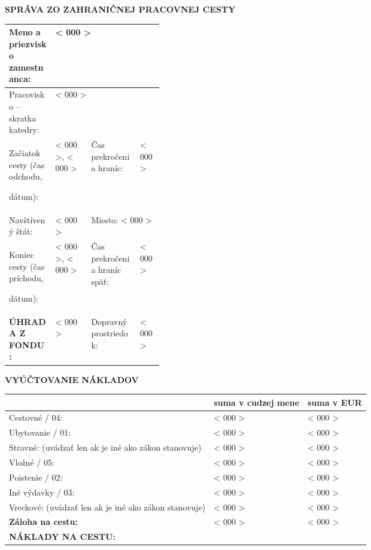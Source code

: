 \documentclass[10pt,a4paper]{article}
\newcommand{\placeholder}[1]{< #1 >}
\newcommand{\name}{\placeholder{000}}
\newcommand{\department}{\placeholder{000}}
\newcommand{\datetimeStart}{\placeholder{000}}
\newcommand{\placeStart}{\placeholder{000}}
\newcommand{\datetimeBorderCrossingStart}{\placeholder{000}}
\newcommand{\country}{\placeholder{000}}
\newcommand{\place}{\placeholder{000}}
\newcommand{\datetimeEnd}{\placeholder{000}}
\newcommand{\placeEnd}{\placeholder{000}}
\newcommand{\datetimeBorderCrossingEnd}{\placeholder{000}}
\newcommand{\sppSymbol}{\placeholder{000}}
\newcommand{\transportation}{\placeholder{000}}
\newcommand{\travellingExpenseForeign}{\placeholder{000}}
\newcommand{\travellingExpense}{\placeholder{000}}
\newcommand{\accommodationExpenseForeign}{\placeholder{000}}
\newcommand{\accommodationExpense}{\placeholder{000}}
\newcommand{\mealsReimbursementForeign}{\placeholder{000}}
\newcommand{\mealsReimbursement}{\placeholder{000}}
\newcommand{\participationExpenseForeign}{\placeholder{000}}
\newcommand{\participationExpense}{\placeholder{000}}
\newcommand{\insuranceExpenseForeign}{\placeholder{000}}
\newcommand{\insuranceExpense}{\placeholder{000}}
\newcommand{\otherExpensesForeign}{\placeholder{000}}
\newcommand{\otherExpenses}{\placeholder{000}}
\newcommand{\allowanceForeign}{\placeholder{000}}
\newcommand{\allowance}{\placeholder{000}}
\newcommand{\advanceExpenseForeign}{\placeholder{000}}
\newcommand{\advanceExpense}{\placeholder{000}}
\begin{document}
{\Large\bf SPRÁVA ZO ZAHRANIČNEJ PRACOVNEJ CESTY}

\def\arraystretch{1.25}
\begin{table}[h!]
\centering
\begin{tabularx}{\linewidth}{|p{0.3\linewidth}|XXX|}
	\hline
	Meno a priezvisko zamestnanca: & \multicolumn{3}{l|}{\name} \\ \hline
	Pracovisko -- skratka katedry: & \multicolumn{3}{l|}{\department} \\ \hline
	Začiatok cesty (čas odchodu,\par dátum): & \multicolumn{1}{l|}{\datetimeStart, \placeStart} & \multicolumn{1}{l|}{Čas prekročenia hraníc:} & \datetimeBorderCrossingStart \\ \hline
	Navštívený štát: & \multicolumn{1}{X|}{\country} & \multicolumn{2}{l|}{Miesto: \place} \\ \hline
	Koniec cesty (čas príchodu,\par dátum): & \multicolumn{1}{l|}{\datetimeEnd, \placeEnd} & \multicolumn{1}{l|}{Čas prekročenia hraníc späť:} & \datetimeBorderCrossingEnd \\ \hline
	\textbf{ÚHRADA Z FONDU:} & \multicolumn{1}{X|}{\sppSymbol} & \multicolumn{1}{l|}{Dopravný prostriedok:} & \transportation \\ \hline
\end{tabularx}
\end{table}

{\large\bf VYÚČTOVANIE NÁKLADOV}
\vspace*{-0.5em}
\begin{table}[h!]
\begin{tabularx}{\linewidth}{|l|X|X|}
	\hline
	& \textbf{suma v cudzej mene} & \textbf{suma v EUR} \\ \hline
	Cestovné / 04: & \travellingExpenseForeign & \travellingExpense \\ \hline
	Ubytovanie / 01: & \accommodationExpenseForeign & \accommodationExpense \\ \hline
	Stravné: (uvádzať len ak je iné ako zákon stanovuje) & \mealsReimbursementForeign & \mealsReimbursement \\ \hline
	Vložné / 05: & \participationExpenseForeign & \participationExpense \\ \hline
	Poistenie / 02: & \insuranceExpenseForeign & \insuranceExpense \\ \hline
	Iné výdavky / 03: & \otherExpensesForeign & \otherExpenses \\ \hline
	Vreckové: (uvádzať len ak je iné ako zákon stanovuje) & \allowanceForeign & \allowance \\ \hline
	\textbf{Záloha na cestu:} & \advanceExpenseForeign & \advanceExpense \\ \hline
	\rule{0pt}{1.6em}{\large\bf NÁKLADY NA CESTU:}\rule{0pt}{1.6em} & & \\ \hline
\end{tabularx}
\end{table}
\end{document}
